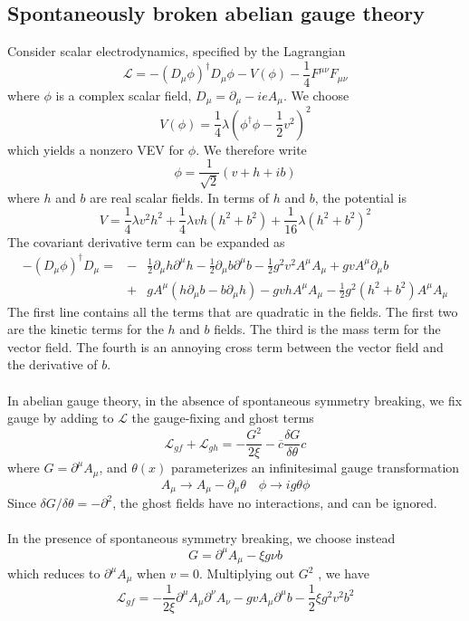 \documentclass[cyan]{elegantnote}
\begin{document}
\subsection{Spontaneously broken abelian gauge theory}
Consider scalar electrodynamics, specified by the Lagrangian
\[\mathcal{L} = -(D_{\mu}\phi)^{\dagger}D_{\mu}\phi - V(\phi) - \frac{1}{4}F^{\mu\nu}F_{\mu\nu}\]
where $\phi$ is a complex scalar field, $D_{\mu} = \partial_{\mu} - ieA_{\mu}$. We choose
\[V(\phi) = \frac{1}{4}\lambda (\phi^{\dagger}\phi - \frac{1}{2}v^2)^2\]
which yields a nonzero VEV for $\phi$. We therefore write
\[\phi = \frac{1}{\sqrt{2}}(v + h + ib)\]
where $h$ and $b$ are real scalar fields. In terms of $h$ and $b$, the potential is
\[V = \frac{1}{4}\lambda v^2 h^2 + \frac{1}{4}\lambda vh(h^2+b^2) + \frac{1}{16}\lambda (h^2+b^2)^2\]
The covariant derivative term can be expanded as
\begin{eqnarray}
-(D_{\mu}\phi)^{\dagger}D_{\mu} = &-& \frac{1}{2}\partial_{\mu}h \partial^{\mu}h -  \frac{1}{2}\partial_{\mu}b \partial^{\mu}b - \frac{1}{2} g^2v^2A^{\mu}A_{\mu} + gv A^{\mu}\partial_{\mu}b \nonumber \\
&+& gA^{\mu} (h\partial_{\mu}b - b\partial_{\mu}h) - gvhA^{\mu}A_{\mu} - \frac{1}{2}g^2(h^2+b^2)A^{\mu}A_{\mu} \nonumber
\end{eqnarray}
The first line contains all the terms that are quadratic in the fields. The first two are the kinetic terms for the $h$ and $b$ fields. The third is the mass term for the vector field. The fourth is an annoying cross term between the vector field and the derivative of $b$.
\\ \\
In abelian gauge theory, in the absence of spontaneous symmetry breaking, we fix gauge by adding to $\mathcal{L}$ the gauge-fixing and ghost terms
\[\mathcal{L}_{gf} + \mathcal{L}_{gh} = - \frac{G^2}{2\xi} - \overline{c}\frac{\delta G}{\delta \theta} c \]
where $G = \partial^{\mu}A_{\mu}$, and $\theta(x)$ parameterizes an infinitesimal gauge transformation
\[A_{\mu} \to A_{\mu} - \partial_{\mu}\theta \quad \phi \to ig\theta\phi\]
Since $\delta G / \delta \theta = - \partial^2$, the ghost fields have no interactions, and can be ignored.
\\ \\
In the presence of spontaneous symmetry breaking, we choose instead
\[G = \partial^{\mu}A_{\mu} - \xi g\nu b\]
which reduces to $\partial^{\mu}A_{\mu}$ when $v = 0$. Multiplying out $G^2$ , we have
\[\mathcal{L}_{gf} = -\frac{1}{2\xi} \partial^{\mu}A_{\mu} \partial^{\nu}A_{\nu} - gvA_{\mu}\partial^{\mu}b - \frac{1}{2}\xi g^2v^2b^2\]
\end{document}
